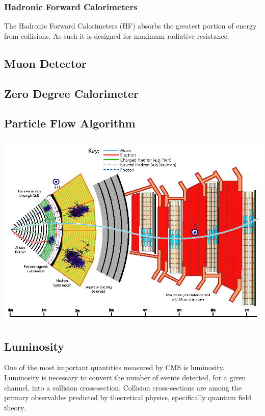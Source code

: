\subsubsection{Hadronic Forward Calorimeters}

The Hadronic Forward Calorimeters (HF) absorbs the greatest portion of energy from collisions. As such it is designed for maximum radiative resistance.

\subsection{Muon Detector}



\subsection{Zero Degree Calorimeter}


\subsection{Particle Flow Algorithm}

\centerline{
\includegraphics[width=5.5in]{Chapter3/importfigs/Figure_001.png}
}


\subsection{Luminosity}

One of the most important quantities measured by CMS is luminosity. Luminosity is necessary to convert the number of events detected, for a given channel, into a collision cross-section. Collision cross-sections are among the primary observables predicted by theoretical physics, specifically quantum field theory.

